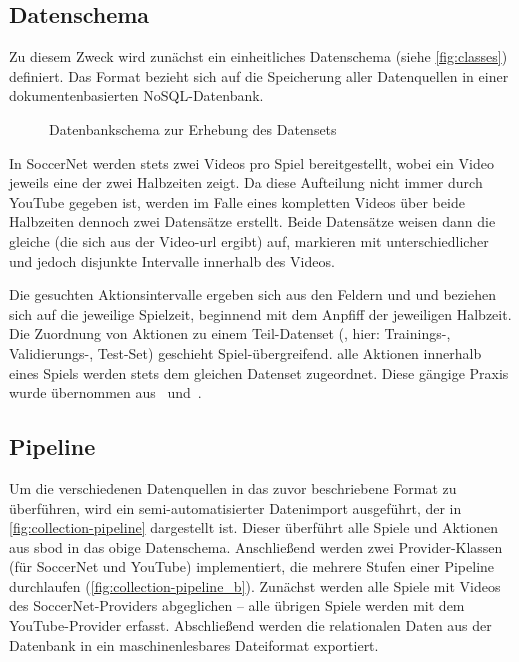 \subsection{Datenschema}
\label{subsec:schema}

Zu diesem Zweck wird zunächst ein einheitliches Datenschema (siehe \autoref{fig:classes}) definiert.
Das Format bezieht sich auf die Speicherung aller Datenquellen in einer dokumentenbasierten NoSQL-Datenbank.

\begin{figure}
    \centering
    \caption{Datenbankschema zur Erhebung des Datensets}
    \label{fig:classes}
\end{figure}

In SoccerNet werden stets zwei Videos pro Spiel bereitgestellt, wobei ein Video jeweils eine der zwei Halbzeiten zeigt.
Da diese Aufteilung nicht immer durch YouTube gegeben ist, werden im Falle eines kompletten Videos über beide Halbzeiten dennoch zwei Datensätze erstellt.
Beide Datensätze weisen dann die gleiche  (die sich aus der Video-\gls{url} ergibt) auf, markieren mit unterschiedlicher  und  jedoch disjunkte Intervalle innerhalb des Videos.

Die gesuchten Aktionsintervalle ergeben sich aus den Feldern  und  und beziehen sich auf die jeweilige Spielzeit, beginnend mit dem Anpfiff der jeweiligen Halbzeit.
Die Zuordnung von Aktionen zu einem Teil-Datenset (, hier: Trainings-, Validierungs-, Test-Set) geschieht Spiel-übergreifend.
\Dh alle Aktionen innerhalb eines Spiels werden stets dem gleichen Datenset zugeordnet.
Diese gängige Praxis wurde übernommen aus~\cite{Giancola18} und~\cite{Jiang19}.

\subsection{Pipeline}
\label{subsec:pipeline}

Um die verschiedenen Datenquellen in das zuvor beschriebene Format zu überführen, wird ein semi-automatisierter Datenimport ausgeführt, der in \autoref{fig:collection-pipeline} dargestellt ist.
Dieser überführt alle Spiele und Aktionen aus \gls{sbod} in das obige Datenschema.
Anschließend werden zwei Provider-Klassen (für SoccerNet und YouTube) implementiert, die mehrere Stufen einer Pipeline durchlaufen (\autoref{fig:collection-pipeline_b}).
Zunächst werden alle Spiele mit Videos des SoccerNet-Providers abgeglichen -- alle übrigen Spiele werden mit dem YouTube-Provider erfasst.
Abschließend werden die relationalen Daten aus der Datenbank in ein maschinenlesbares Dateiformat exportiert.

